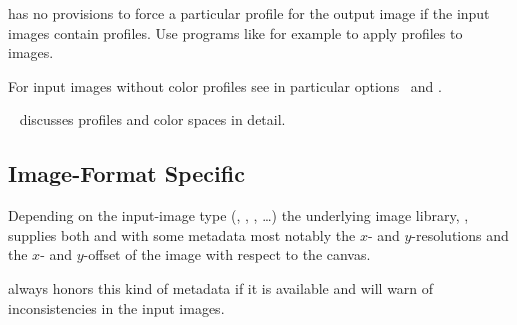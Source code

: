 \App{} has no provisions to force a particular  profile for the output image if the
input images contain profiles.  Use programs like for example
 to apply profiles to  images.

For input images without color profiles see in particular
options~ and
.

\chapterName~ discusses  profiles and color spaces in
detail.


\subsection[Format Specific]{\label{sec:metadata-specific}%
  Image-Format Specific}

%
%
%
%
%
%
Depending on the input-image type (, , , \dots) the
underlying image library, , supplies both \App{} and
\OtherApp{} with some metadata most notably the $x$- and $y$-resolutions and the $x$- and
$y$-offset of the image with respect to the canvas.

\App{} always honors this kind of metadata if it is available and will warn of inconsistencies
in the input images.


